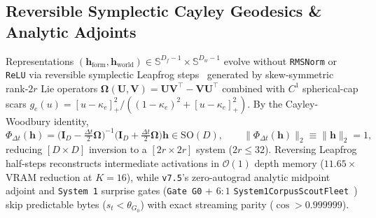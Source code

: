 \documentclass[10pt,twocolumn]{article}
\begin{document}
\subsection{Reversible Symplectic Cayley Geodesics \& Analytic Adjoints}
Representations $(\mathbf{h}_{\text{form}}, \mathbf{h}_{\text{world}}) \in \mathbb{S}^{D_f-1} \times \mathbb{S}^{D_w-1}$ evolve without \texttt{RMSNorm} or \texttt{ReLU} via reversible symplectic Leapfrog steps~\citep{hairer2006geometric} generated by skew-symmetric rank-$2r$ Lie operators $\boldsymbol{\Omega}(\mathbf{U},\mathbf{V}) = \mathbf{U}\mathbf{V}^\top - \mathbf{V}\mathbf{U}^\top$ combined with $C^1$ spherical-cap scars $g_e(u) = [u - \kappa_e]_+^2 / ((1-\kappa_e)^2 + [u-\kappa_e]_+^2)$. By the Cayley-Woodbury identity,
\begin{equation}
    \Phi_{\Delta t}(\mathbf{h}) = \Big(\mathbf{I}_D - \tfrac{\Delta t}{2}\boldsymbol{\Omega}\Big)^{-1}\Big(\mathbf{I}_D + \tfrac{\Delta t}{2}\boldsymbol{\Omega}\Big)\mathbf{h} \in \mathrm{SO}(D), \qquad \|\Phi_{\Delta t}(\mathbf{h})\|_2 \equiv \|\mathbf{h}\|_2 = 1,
    \label{eq:cayley_woodbury}
\end{equation}
reducing $[D \times D]$ inversion to a $[2r \times 2r]$ system ($2r \le 32$). Reversing Leapfrog half-steps reconstructs intermediate activations in $\mathcal{O}(1)$ depth memory ($\mathbf{11.65\times}$ VRAM reduction at $K=16$), while \texttt{v7.5}'s zero-autograd analytic midpoint adjoint and \texttt{System~1} surprise gates (\texttt{Gate G0} + $6:1$ \texttt{System1CorpusScoutFleet}~\citep{leviathan2023fast}) skip predictable bytes ($s_t < \theta_{G_0}$) with exact streaming parity ($\cos > 0.999999$).
\end{document}
